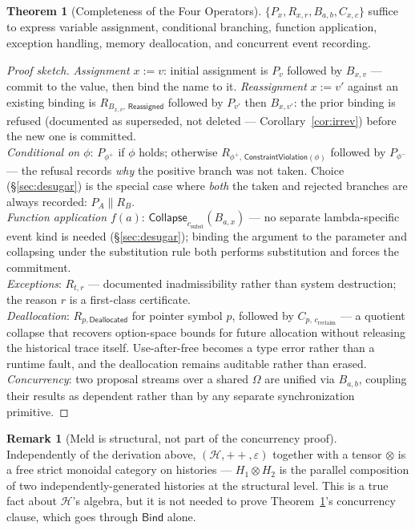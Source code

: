 \documentclass[12pt]{article}
\theoremstyle{definition}
\newtheorem{theorem}{Theorem}
\newtheorem{remark}{Remark}
\newcommand{\CollapseOp}{\mathsf{Collapse}}
\newcommand{\BindOp}{\mathsf{Bind}}
\newcommand{\CalH}{\mathcal{H}}
\newcommand{\Meld}{\otimes}
\begin{document}
\begin{theorem}[Completeness of the Four Operators]
\label{thm:completeness}
$\{P_x, R_{x,r}, B_{a,b}, C_{x,c}\}$ suffice to express variable assignment, conditional branching, function application, exception handling, memory deallocation, and concurrent event recording.
\end{theorem}

\begin{proof}[Proof sketch]
\emph{Assignment $x := v$}: initial assignment is $P_v$ followed by $B_{x,v}$ — commit to the value, then bind the name to it. \emph{Reassignment} $x := v'$ against an existing binding is $R_{B_{x,v},\,\mathsf{Reassigned}}$ followed by $P_{v'}$ then $B_{x,v'}$: the prior binding is refused (documented as superseded, not deleted — Corollary~\ref{cor:irrev}) before the new one is committed.\\
\emph{Conditional on $\phi$}: $P_{\phi^+}$ if $\phi$ holds; otherwise $R_{\phi^+,\,\mathsf{ConstraintViolation}(\phi)}$ followed by $P_{\phi^-}$ — the refusal records \emph{why} the positive branch was not taken. Choice (\S\ref{sec:desugar}) is the special case where \emph{both} the taken and rejected branches are always recorded: $P_A \parallel R_{B}$.\\
\emph{Function application $f(a)$}: $\CollapseOp_{c_\mathrm{subst}}(B_{a,x})$ — no separate lambda-specific event kind is needed (\S\ref{sec:desugar}); binding the argument to the parameter and collapsing under the substitution rule both performs substitution and forces the commitment.\\
\emph{Exceptions}: $R_{t,r}$ — documented inadmissibility rather than system destruction; the reason $r$ is a first-class certificate.\\
\emph{Deallocation}: $R_{p,\mathsf{Deallocated}}$ for pointer symbol $p$, followed by $C_{p,\,c_\mathrm{reclaim}}$ — a quotient collapse that recovers option-space bounds for future allocation without releasing the historical trace itself. Use-after-free becomes a type error rather than a runtime fault, and the deallocation remains auditable rather than erased.\\
\emph{Concurrency}: two proposal streams over a shared $\Omega$ are unified via $B_{a,b}$, coupling their results as dependent rather than by any separate synchronization primitive.
\end{proof}

\begin{remark}[Meld is structural, not part of the concurrency proof]
Independently of the derivation above, $(\CalH, \mathbin{{+}\!+}, \varepsilon)$ together with a tensor $\Meld$ is a free strict monoidal category on histories — $H_1 \Meld H_2$ is the parallel composition of two independently-generated histories at the structural level. This is a true fact about $\CalH$'s algebra, but it is not needed to prove Theorem~\ref{thm:completeness}'s concurrency clause, which goes through $\BindOp$ alone.
\end{remark}
\end{document}
